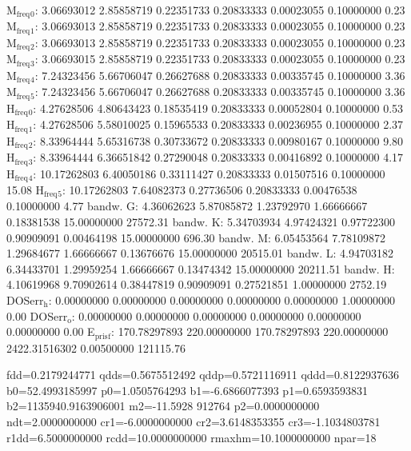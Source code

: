 \documentclass[11pt]{article}
\begin{document}
M\(_{\text{freq}}\)\(_{\text{0}}\):   3.06693012   2.85858719   0.22351733   0.20833333   0.00023055   0.10000000         0.23
M\(_{\text{freq}}\)\(_{\text{1}}\):   3.06693013   2.85858719   0.22351733   0.20833333   0.00023055   0.10000000         0.23
M\(_{\text{freq}}\)\(_{\text{2}}\):   3.06693013   2.85858719   0.22351733   0.20833333   0.00023055   0.10000000         0.23
M\(_{\text{freq}}\)\(_{\text{3}}\):   3.06693015   2.85858719   0.22351733   0.20833333   0.00023055   0.10000000         0.23
M\(_{\text{freq}}\)\(_{\text{4}}\):   7.24323456   5.66706047   0.26627688   0.20833333   0.00335745   0.10000000         3.36
M\(_{\text{freq}}\)\(_{\text{5}}\):   7.24323456   5.66706047   0.26627688   0.20833333   0.00335745   0.10000000         3.36
H\(_{\text{freq}}\)\(_{\text{0}}\):   4.27628506   4.80643423   0.18535419   0.20833333   0.00052804   0.10000000         0.53
H\(_{\text{freq}}\)\(_{\text{1}}\):   4.27628506   5.58010025   0.15965533   0.20833333   0.00236955   0.10000000         2.37
H\(_{\text{freq}}\)\(_{\text{2}}\):   8.33964444   5.65316738   0.30733672   0.20833333   0.00980167   0.10000000         9.80
H\(_{\text{freq}}\)\(_{\text{3}}\):   8.33964444   6.36651842   0.27290048   0.20833333   0.00416892   0.10000000         4.17
H\(_{\text{freq}}\)\(_{\text{4}}\):  10.17262803   6.40050186   0.33111427   0.20833333   0.01507516   0.10000000        15.08
H\(_{\text{freq}}\)\(_{\text{5}}\):  10.17262803   7.64082373   0.27736506   0.20833333   0.00476538   0.10000000         4.77
bandw. G:   4.36062623   5.87085872   1.23792970   1.66666667   0.18381538  15.00000000     27572.31
bandw. K:   5.34703934   4.97424321   0.97722300   0.90909091   0.00464198  15.00000000       696.30
bandw. M:   6.05453564   7.78109872   1.29684677   1.66666667   0.13676676  15.00000000     20515.01
bandw. L:   4.94703182   6.34433701   1.29959254   1.66666667   0.13474342  15.00000000     20211.51
bandw. H:   4.10619968   9.70902614   0.38447819   0.90909091   0.27521851   1.00000000      2752.19
DOSerr\(_{\text{h}}\):   0.00000000   0.00000000   0.00000000   0.00000000   0.00000000   1.00000000         0.00
DOSerr\(_{\text{o}}\):   0.00000000   0.00000000   0.00000000   0.00000000   0.00000000   0.00000000         0.00
E\(_{\text{pris}}\)\(_{\text{f}}\): 170.78297893 220.00000000 170.78297893 220.00000000 2422.31516302   0.00500000    121115.76


  fdd=0.2179244771 qdds=0.5675512492 qddp=0.5721116911 qddd=0.8122937636 b0=52.4993185997 p0=1.0505764293 b1=-6.6866077393 p1=0.6593593831 b2=1135940.9163906001 m2=-11.5928
912764 p2=0.0000000000 ndt=2.0000000000 cr1=-6.0000000000 cr2=3.6148353355 cr3=-1.1034803781 r1dd=6.5000000000 rcdd=10.0000000000 rmaxhm=10.1000000000 npar=18 
\end{document}
